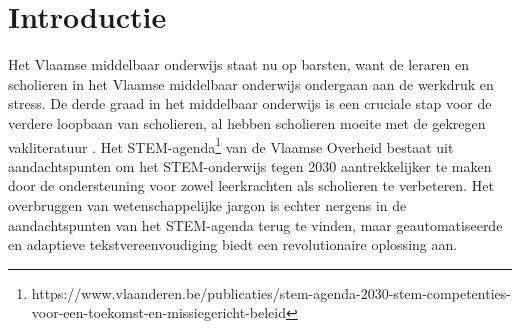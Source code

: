 
\section{Introductie}%
\label{sec:introductie}


Het Vlaamse middelbaar onderwijs staat nu op barsten, want de leraren en scholieren in het Vlaamse middelbaar onderwijs ondergaan aan de werkdruk en stress. De derde graad in het middelbaar onderwijs is een cruciale stap voor de verdere loopbaan van scholieren, al hebben scholieren moeite met de gekregen vakliteratuur \autocite{Dapaah2022}. Het STEM-agenda\footnote{https://www.vlaanderen.be/publicaties/stem-agenda-2030-stem-competenties-voor-een-toekomst-en-missiegericht-beleid} van de Vlaamse Overheid bestaat uit aandachtspunten om het STEM-onderwijs tegen 2030 aantrekkelijker te maken door de ondersteuning voor zowel leerkrachten als scholieren te verbeteren. Het overbruggen van wetenschappelijke jargon is echter nergens in de aandachtspunten van het STEM-agenda terug te vinden, maar geautomatiseerde en adaptieve tekstvereenvoudiging biedt een revolutionaire oplossing aan. 

